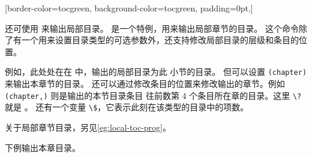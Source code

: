 \documentclass{cusdoc}
\begin{document}
\startmulticolumns[2,ragged,outer-sep=0pt,framed=lfbox,overflow=0pt,
  adj-outer=-\dimeval{\paperwidth-3.4cm-\textwidth}]
\newcommand{\tochyperpage}{\toclink{\tocthepage}}
\hypersetup{hidelinks}
\makeatletter
{}
  {}
  {\noindent}
  {\fparbox{\linewidth}[border-color=tocgreen, background-color=tocgreen, padding={0pt,\fboxsep}]
    {\ccwd {} \color{white}\bfseries\large
      \strut \tocifnamed{\tocthename\quad\kern-.3em}{}\tocthetitle
      \breakablefiller[space]\tochyperpage\par}\par }
  {\smallskip}
  {}
  {\smallskip
    \begin{list}{}{\ccwd {}\z@ 
      \itemindent-\ccwd \listparindent\itemindent
      \topsep\z@ \partopsep\z@ \itemsep\z@ \parsep\z@ \parskip\z@}}
  {\item \begingroup\color{tocgreen}\bfseries}
  {\tocifnamed{\tocthename\quad}{}\tocthetitle\breakablefiller[space]%
    \makebox[1.5em][r]{\tochyperpage\;}\par }
  {\endgroup}
  {\end{list}}
  {}
  {\begingroup\color{black}\bfseries}
  {\tocifnamed{\tocthename\quad}{}\tocthetitle\breakablefiller[dotted]%
    \makebox[1.5em][r]{\tochyperpage\;}\par }
  {\endgroup}
  {}
\makeatother 
\specifiedtoc
\stopmulticolumns



还可使用  来输出局部目录。
 是一个特例，用来输出局部章节的目录。
这个命令除了有一个用来设置目录类型的可选参数外，还支持修改局部目录的层级和条目的位置。

例如，此处处在在  中，输出的局部目录为此  小节的目录。
但可以设置 \texttt{(chapter)} 来输出本章节的目录。
还可以通过修改条目的位置来修改输出的章节。例如 
\texttt{(chapter,\string{})} 则是输出的本节目录条目
往前数第 4 个条目所在章的目录。这里 \verb|\?| 就是 。
还有一个变量 \verb|\$|，它表示此刻在该类型的目录中的项数。

关于局部章节目录，另见\cref{eg:local-toc-prog}。

下例输出本章目录。
\end{document}
